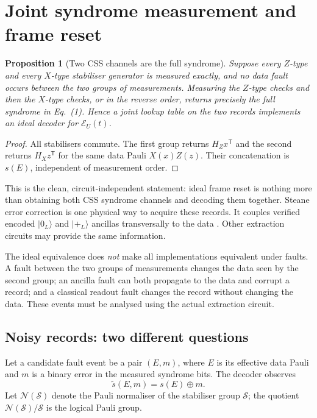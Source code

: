 \documentclass[11pt]{article}
\newtheorem{proposition}[definition]{Proposition}
\theoremstyle{remark}
\newcommand{\cS}{\mathcal S}
\newcommand{\cE}{\mathcal E}
\newcommand{\cN}{\mathcal N}
\begin{document}
\section{Joint syndrome measurement and frame reset}

\begin{proposition}[Two CSS channels are the full syndrome]
Suppose every $Z$-type and every $X$-type stabiliser generator is measured
exactly, and no data fault occurs between the two groups of measurements.
Measuring the $Z$-type checks and then the $X$-type checks, or in the reverse
order, returns precisely the full syndrome in Eq.~(1).  Hence a joint lookup
table on the two records implements an ideal decoder for $\cE_U(t)$.
\end{proposition}

\begin{proof}
All stabilisers commute.  The first group returns $H_Zx^{\mathsf T}$ and the
second returns $H_Xz^{\mathsf T}$ for the same data Pauli $X(x)Z(z)$.  Their
concatenation is $s(E)$, independent of measurement order.
\end{proof}

This is the clean, circuit-independent statement: ideal frame reset is
nothing more than obtaining both CSS syndrome channels and decoding them
together.  Steane error correction is one physical way to acquire these
records.  It couples verified encoded $|0_L\rangle$ and $|+_L\rangle$
ancillas transversally to the data \cite{SteaneEC}.  Other extraction
circuits may provide the same information.

The ideal equivalence does \emph{not} make all implementations equivalent
under faults.  A fault between the two groups of measurements changes the
data seen by the second group; an ancilla fault can both propagate to the
data and corrupt a record; and a classical readout fault changes the record
without changing the data.  These events must be analysed using the actual
extraction circuit.

\subsection{Noisy records: two different questions}

Let a candidate fault event be a pair $(E,m)$, where $E$ is its effective
data Pauli and $m$ is a binary error in the measured syndrome bits.  The
decoder observes
\[
 \widetilde s(E,m)=s(E)\oplus m.
 \tag{6}
\]
Let $\cN(\cS)$ denote the Pauli normaliser of the stabiliser group
$\cS$; the quotient $\cN(\cS)/\cS$ is the logical Pauli group.
\end{document}
